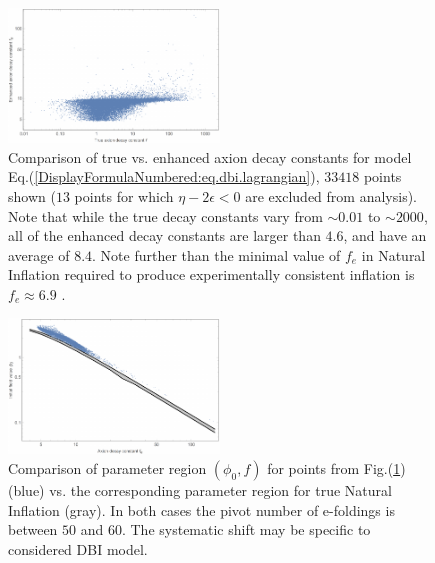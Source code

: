 \documentclass[12pt]{article}
\begin{document}
\begin{figure}
\centering
\includegraphics[width=0.5\textwidth]{figs/fige.pdf}
\caption{Comparison of true vs. enhanced axion decay constants for model Eq.(\ref{DisplayFormulaNumbered:eq.dbi.lagrangian}), $33418$ points shown ($13$ points for which $\eta - 2\epsilon < 0$ are excluded from analysis). Note that while the true decay constants vary from $\sim 0.01$ to $\sim 2000$, all of the enhanced decay constants are larger than $4.6$, and have an average of $8.4$. Note further than the minimal value of ${f}_{e}$ in Natural Inflation required to produce experimentally consistent inflation is ${f}_{e} \approx 6.9$ \cite{Ade:2015lrj}.}
\label{Figure:fig.enhancement.sim}
\end{figure}

\begin{figure}
\centering
\includegraphics[width=0.5\textwidth]{figs/figc.pdf}
\caption{Comparison of parameter region $\left({\phi}_{0}, f\right)$ for points from Fig.(\ref{Figure:fig.enhancement.sim}) (blue) vs. the corresponding parameter region for true Natural Inflation (gray). In both cases the pivot number of e-foldings is between $50$ and $60$. The systematic shift may be specific to considered DBI model.}
\label{fig.comparison.sim}
\end{figure}
\end{document}
